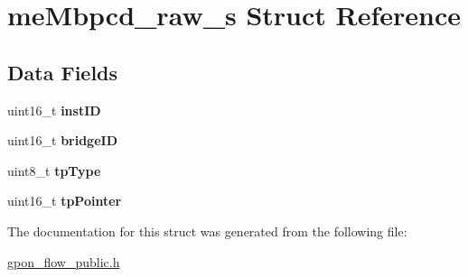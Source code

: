 \hypertarget{structmeMbpcd__raw__s}{}\section{me\+Mbpcd\+\_\+raw\+\_\+s Struct Reference}
\label{structmeMbpcd__raw__s}
\subsection*{Data Fields}
\begin{DoxyCompactItemize}
\item 
\mbox{\label{structmeMbpcd__raw__s_af809a0f6f3ad928f95e1f7f7cdcb13f9}} 
uint16\+\_\+t {\bfseries inst\+ID}
\item 
\mbox{\label{structmeMbpcd__raw__s_a453c6ad88accbf7032aa394e099d62f1}} 
uint16\+\_\+t {\bfseries bridge\+ID}
\item 
\mbox{\label{structmeMbpcd__raw__s_a499f7a33cd464e7e42dc97dbc69a54b3}} 
uint8\+\_\+t {\bfseries tp\+Type}
\item 
\mbox{\label{structmeMbpcd__raw__s_a25ab10257cdefe6e57afbc7b5c40e5af}} 
uint16\+\_\+t {\bfseries tp\+Pointer}
\end{DoxyCompactItemize}


The documentation for this struct was generated from the following file\+:\begin{DoxyCompactItemize}
\item 
\hyperlink{gpon__flow__public_8h}{gpon\+\_\+flow\+\_\+public.\+h}\end{DoxyCompactItemize}
